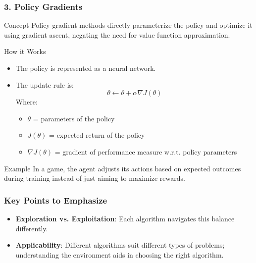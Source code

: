 \documentclass{beamer}
\begin{document}
\begin{frame}[fragile]
    \frametitle{3. Policy Gradients}
    \begin{block}{Concept}
        Policy gradient methods directly parameterize the policy and optimize it using gradient ascent, negating the need for value function approximation.
    \end{block}

    \begin{block}{How it Works}
        \begin{itemize}
            \item The policy is represented as a neural network.
            \item The update rule is:
            \begin{equation}
            \theta \gets \theta + \alpha \nabla J(\theta)
            \end{equation}
            Where:
            \begin{itemize}
                \item $\theta$ = parameters of the policy
                \item $J(\theta)$ = expected return of the policy
                \item $\nabla J(\theta)$ = gradient of performance measure w.r.t. policy parameters
            \end{itemize}
        \end{itemize}
    \end{block}

    \begin{block}{Example}
        In a game, the agent adjusts its actions based on expected outcomes during training instead of just aiming to maximize rewards.
    \end{block}
\end{frame}

\begin{frame}[fragile]
    \frametitle{Key Points to Emphasize}
    \begin{itemize}
        \item \textbf{Exploration vs. Exploitation}: Each algorithm navigates this balance differently.
        \item \textbf{Applicability}: Different algorithms suit different types of problems; understanding the environment aids in choosing the right algorithm.
    \end{itemize}
\end{frame}
\end{document}
